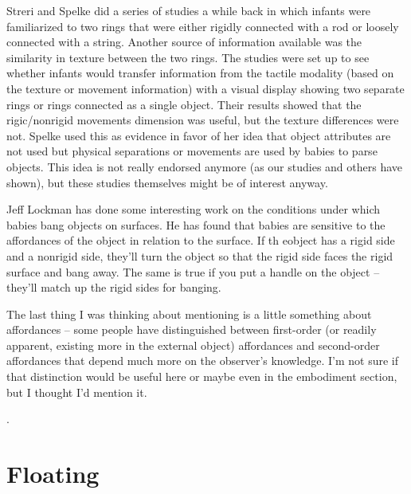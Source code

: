 \ifverbose

Streri and Spelke did a series of studies a while back in which
infants were familiarized to two rings that were either rigidly
connected with a rod or loosely connected with a string.  Another
source of information available was the similarity in texture between
the two rings.  The studies were set up to see whether infants would
transfer information from the tactile modality (based on the texture
or movement information) with a visual display showing two separate
rings or rings connected as a single object.  Their results showed
that the rigic/nonrigid movements dimension was useful, but the
texture differences were not. Spelke used this as evidence in favor of
her idea that object attributes are not used but physical separations
or movements are used by babies to parse objects.  This idea is not
really endorsed anymore (as our studies and others have shown), but
these studies themselves might be of interest anyway.



Jeff Lockman has done some interesting work on the conditions under
which babies bang objects on surfaces.  He has found that babies are
sensitive to the affordances of the object in relation to the surface.
If th eobject has a rigid side and a nonrigid side, they'll turn the
object so that the rigid side faces the rigid surface and bang away.
The same is true if you put a handle on the object -- they'll match up
the rigid sides for banging.

\fi

\ifverbose

The last thing I was thinking about mentioning is a little something
about affordances -- some people have distinguished between
first-order (or readily apparent, existing more in the external
object) affordances and second-order affordances that depend much more
on the observer's knowledge.  I'm not sure if that distinction would
be useful here or maybe even in the embodiment section, but I thought
I'd mention it.

\fi



\nocite{lewkowicz00development}
\nocite{lewkowicz80crossmodal}
\nocite{lewkowicz04learning}
\nocite{bahrick04development}
\nocite{hernandez01development}
\nocite{bahrick03development}
\nocite{bahrick00intersensory}
\nocite{gibson86ecological}
\nocite{prince05synching}
\nocite{bushnell85recognition}.



\section{Floating}


